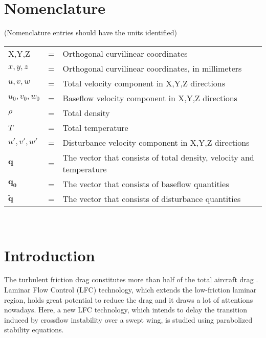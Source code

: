 \documentclass{AIAA}
\begin{document}
\section*{Nomenclature}
(Nomenclature entries should have the units identified)\\
\noindent\begin{tabular}{@{}lcl@{}}
X,Y,Z                 &=& Orthogonal curvilinear coordinates \\
$x,y,z$               &=& Orthogonal curvilinear coordinates, in millimeters \\
$u,v,w$               &=& Total velocity component in X,Y,Z directions \\
$u_0,v_0,w_0$         &=& Baseflow velocity component in X,Y,Z directions \\
$\rho$                &=& Total density \\
$T$                   &=& Total temperature \\
$u',v',w'$            &=& Disturbance velocity component in X,Y,Z directions \\
$\mathbf{q}$          &=& The vector that consists of total density, velocity and temperature \\
$\mathbf{q_0}$        &=& The vector that consists of baseflow quantities \\
$\mathbf{\tilde{q}}$  &=& The vector that consists of disturbance quantities \\
\end{tabular} \\



\section{Introduction}
The turbulent friction drag constitutes more than half of the total aircraft drag \cite{Schrauf2005}. Laminar Flow Control (LFC) technology, which extends the low-friction laminar region, holds great potential to reduce the drag and it draws a lot of attentions nowadays. Here, a new LFC technology, which intends to delay the transition induced by crossflow instability over a swept wing, is studied using parabolized stability equations.
\end{document}
